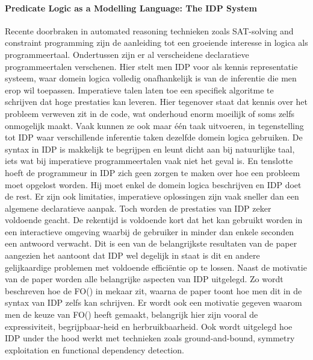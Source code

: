 \paragraph{Predicate Logic as a Modelling Language: The IDP System \cite{bogaerts14}}
Recente doorbraken in automated reasoning technieken zoals SAT-solving and constraint programming zijn de aanleiding tot een groeiende interesse in logica als programmeertaal. Ondertussen zijn er al verscheidene declaratieve programmeertalen verschenen. Hier stelt men IDP voor als kennis representatie systeem, waar domein logica volledig onafhankelijk is van de inferentie die men erop wil toepassen. Imperatieve talen laten toe een specifiek algoritme te schrijven dat hoge prestaties kan leveren. Hier tegenover staat dat kennis over het probleem verweven zit in de code, wat onderhoud enorm moeilijk of soms zelfs onmogelijk maakt. Vaak kunnen ze ook maar \'{e}\'{e}n taak uitvoeren, in tegenstelling tot IDP waar verschillende inferentie taken dezelfde domein logica gebruiken. De syntax in IDP is makkelijk te begrijpen en leunt dicht aan bij natuurlijke taal, iets wat bij imperatieve programmeertalen vaak niet het geval is. En tenslotte hoeft de programmeur in IDP zich geen zorgen te maken over hoe een probleem moet opgelost worden. Hij moet enkel de domein logica beschrijven en IDP doet de rest. 
Er zijn ook limitaties, imperatieve oplossingen zijn vaak sneller dan een algemene declaratieve aanpak. Toch worden de prestaties van IDP zeker voldoende geacht. De rekentijd is voldoende kort dat het kan gebruikt worden in een interactieve omgeving waarbij de gebruiker in minder dan enkele seconden een antwoord verwacht. Dit is een van de belangrijkste resultaten van de paper aangezien het aantoont dat IDP wel degelijk in staat is dit en andere gelijkaardige problemen met voldoende effici\"{e}ntie op te lossen. Naast de motivatie van de paper worden alle belangrijke aspecten van IDP uitgelegd. Zo wordt beschreven hoe de FO(\textperiodcentered) in mekaar zit, waarna de paper toont hoe men dit in de syntax van IDP zelfs kan schrijven. Er wordt ook een motivatie gegeven waarom men de keuze van FO(\textperiodcentered) heeft gemaakt, belangrijk hier zijn vooral de expressiviteit, begrijpbaar-heid en herbruikbaarheid. Ook wordt uitgelegd hoe IDP under the hood werkt met technieken zoals ground-and-bound, symmetry exploitation en functional dependency detection.


